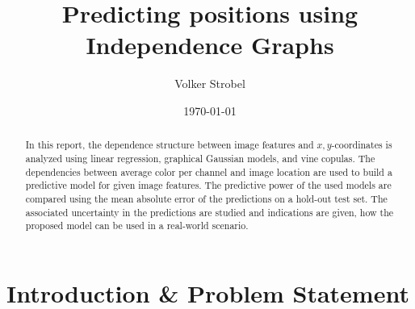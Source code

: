 \documentclass{article}
\title{Predicting positions using Independence Graphs}
\author{Volker Strobel}
\date{\today}
\begin{document}
\maketitle









\begin{abstract}
  In this report, the dependence structure between image features and
  $x,y$-coordinates is analyzed using linear regression, graphical
  Gaussian models, and vine copulas. The dependencies between average
  color per channel and image location are used to build a predictive
  model for given image features. The predictive power of the used
  models are compared using the mean absolute error of the predictions
  on a hold-out test set. The associated uncertainty in the
  predictions are studied and indications are given, how the proposed
  model can be used in a real-world scenario.
\end{abstract}


\section{Introduction \& Problem Statement}




\end{document}
